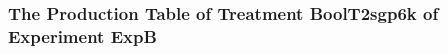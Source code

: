  \begin{frame}
 \fontsize{8pt}{9pt}\selectfont
 \frametitle{ The Production Table of Treatment BoolT2sgp6k of Experiment ExpB }

 \label{ExpBGrammarTable017.tex}  
 \end{frame}

